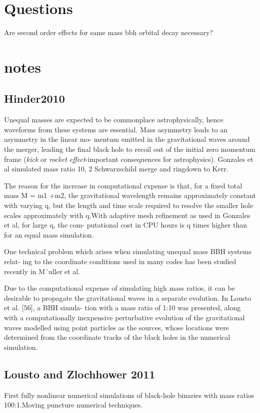 \documentclass{article}
\begin{document}
\section{Questions} 
Are second order effects for same mass bbh orbital decay necessary?

\section{notes}
\subsection{Hinder2010}
Unequal masses are expected to be commonplace astrophysically, hence waveforms from these systems are essential. Mass asymmetry leads to an asymmetry in the linear mo- mentum emitted in the gravitational waves around the merger, leading the final black hole to recoil out of the initial zero momentum frame (\textit{kick} or \textit{rocket effect}-important consequences for astrophysics). Gonzales et al simulated mass ratio 10, 2 Schwarzschild merge and ringdown to Kerr. 

The reason for the increase in computational expense is that, for a fixed total mass M = m1 +m2, the gravitational wavelength remains approximately constant with varying q, but the length and time scale required to resolve the smaller hole scales approximately with q.With adaptive mesh refinement as used in Gonzales et al, for large q, the com- putational cost in CPU hours is q times higher than for an equal mass simulation. 

One technical problem which arises when simulating unequal mass BBH systems relat- ing to the coordinate conditions used in many codes has been studied recently in M¨uller et al.

Due to the computational expense of simulating high mass ratios, it can be desirable to propagate the gravitational waves in a separate evolution. In Lousto et al. [56], a BBH simula- tion with a mass ratio of 1:10 was presented, along with a computationally inexpensive perturbative evolution of the gravitational waves modelled using point particles as the sources, whose locations were determined from the coordinate tracks of the black holes in the numerical simulation.

\subsection{Lousto and Zlochhower 2011}
First fully nonlinear numerical simulations of black-hole binaries with mass ratios 100:1.Moving puncture numerical techniques.
\end{document}
